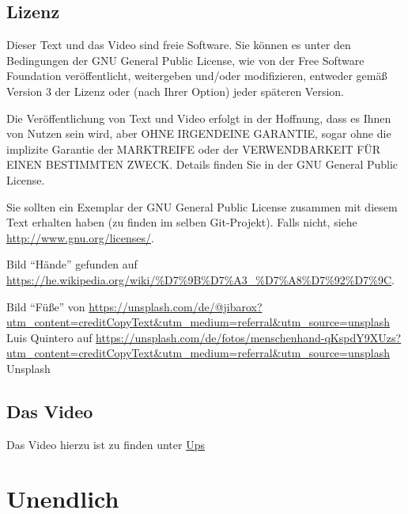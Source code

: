 \documentclass[a4paper]{amsart}
\theoremstyle{definition}
\begin{document}
\subsection*{Lizenz}
Dieser Text und das Video sind freie Software. Sie können es unter den Bedingungen der
GNU General Public License, wie von der Free Software Foundation veröffentlicht, weitergeben
und/oder modifizieren, entweder gemäß Version 3 der Lizenz oder (nach Ihrer Option) jeder späteren Version.

Die Veröffentlichung von Text und Video erfolgt in der Hoffnung, dass es Ihnen von Nutzen sein wird,
aber OHNE IRGENDEINE GARANTIE, sogar ohne die implizite Garantie der MARKTREIFE oder der
VERWENDBARKEIT FÜR EINEN BESTIMMTEN ZWECK. Details finden Sie in der GNU General Public License.

Sie sollten ein Exemplar der GNU General Public License zusammen mit diesem Text erhalten haben
(zu finden im selben Git-Projekt).
Falls nicht, siehe \url{http://www.gnu.org/licenses/}.

Bild "`Hände"' gefunden auf \url{https://he.wikipedia.org/wiki/%D7%9B%D7%A3_%D7%A8%D7%92%D7%9C}.

Bild "`Füße"' von \url{https://unsplash.com/de/@jibarox?utm_content=creditCopyText\&utm_medium=referral\&utm_source=unsplash} Luis Quintero auf \url{https://unsplash.com/de/fotos/menschenhand-qKspdY9XUzs?utm\_content=creditCopyText\&utm_medium=referral\&utm\_source=unsplash} Unsplash

\subsection*{Das Video}
Das Video hierzu ist zu finden unter \url{Ups}

\section{Unendlich}
\def\kategoryVspace{5pt}
\end{document}
